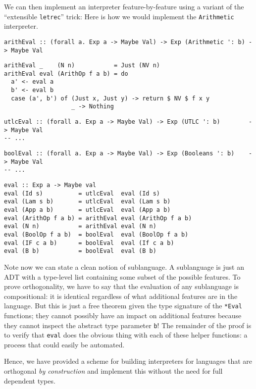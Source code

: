 \documentclass[12pt]{article}
\begin{document}
We can then implement an interpreter feature-by-feature using a variant of the ``extensible
\verb|letrec|'' trick: Here is how we would implement the \texttt{Arithmetic} interpreter.

\begin{verbatim}
arithEval :: (forall a. Exp a -> Maybe Val) -> Exp (Arithmetic ': b) -> Maybe Val
\end{verbatim}
\begin{verbatim}
arithEval _    (N n)           = Just (NV n)
arithEval eval (ArithOp f a b) = do 
  a' <- eval a
  b' <- eval b
  case (a', b') of (Just x, Just y) -> return $ NV $ f x y
                   _ -> Nothing
\end{verbatim}
\begin{verbatim}
utlcEval :: (forall a. Exp a -> Maybe Val) -> Exp (UTLC ': b)        -> Maybe Val
-- ...
\end{verbatim}
\begin{verbatim}
boolEval :: (forall a. Exp a -> Maybe Val) -> Exp (Booleans ': b)    -> Maybe Val
-- ...
\end{verbatim}
\begin{verbatim}
eval :: Exp a -> Maybe val
eval (Id s)          = utlcEval  eval (Id s)
eval (Lam s b)       = utlcEval  eval (Lam s b)
eval (App a b)       = utlcEval  eval (App a b)
eval (ArithOp f a b) = arithEval eval (ArithOp f a b)
eval (N n)           = arithEval eval (N n)
eval (BoolOp f a b)  = boolEval  eval (BoolOp f a b)
eval (IF c a b)      = boolEval  eval (If c a b)
eval (B b)           = boolEval  eval (B b)
\end{verbatim}

Note now we can state a clean notion of sublanguage. A sublanguage is just an
ADT with a type-level list containing some subset of the possible features. To
prove orthogonality, we have to say that the evaluation of any sublanguage is
compositional: it is identical regardless of what additional features are in the
language. But this is just a free theorem given the type signature of the
\texttt{*Eval} functions; they cannot possibly have an impact on additional
features because they cannot inspect the abstract type parameter \texttt{b}! The
remainder of the proof is to verify that \texttt{eval} does the obvious thing
with each of these helper functions: a process that could easily be automated.

Hence, we have provided a scheme for building interpreters for languages that
are orthogonal \emph{by construction} and implement this without the need for
full dependent types.
\end{document}
